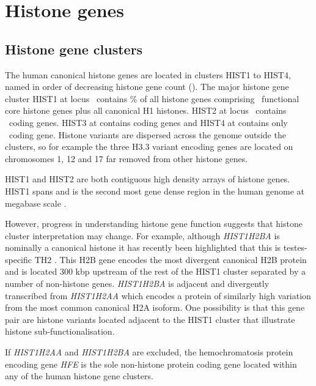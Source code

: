 \section{Histone genes}

  \subsection{Histone gene clusters}
    The human canonical histone genes are located in clusters HIST1 to HIST4, 
	named in order of decreasing histone gene count ().
	The major histone gene cluster HIST1 at locus~\HISTOneLocus{}  
	contains \% of all histone genes 
	comprising \CodingGenesInHISTOne{}~functional core histone genes plus all canonical H1 histones. 
	HIST2 at locus~\HISTTwoLocus{} contains \CodingGenesInHISTTwo{}~coding genes. 
	HIST3 at \HISTThreeLocus{} contains \CodingGenesInHISTThree{} coding genes 
	and HIST4 at \HISTFourLocus{} contains only \CodingGenesInHISTFour{}~coding gene. 
	Histone variants are dispersed across the genome outside the clusters, 
	so for example the three H3.3 variant encoding genes are located on chromosomes 1, 12 and 17 
	far removed from other histone genes.

	HIST1 and HIST2 are both contiguous high density arrays of histone genes. 
	HIST1 spans \HISTOneSpan{} 
	and is the second most gene dense region in the human genome at megabase scale \citep{MHC-III-analysis}.

	However, progress in understanding histone gene function suggests 
	that histone cluster interpretation may change. 
	For example, although \textit{HIST1H2BA} is nominally a canonical histone 
	it has recently been highlighted that this is testes-specific TH2 \citep{Urahama2014}.
	This H2B gene encodes the most divergent canonical H2B protein 
	and is located 300 kbp upstream of the rest of the HIST1 cluster 
	separated by a number of non-histone genes. 
	\textit{HIST1H2BA} is adjacent and divergently transcribed from \textit{HIST1H2AA} 
	which encodes a protein of similarly high variation from the most common canonical H2A isoform. 
	One possibility is that this gene pair are histone variants 
	located adjacent to the HIST1 cluster that illustrate histone sub-functionalisation.

	If \textit{HIST1H2AA} and \textit{HIST1H2BA} are excluded, 
	the hemochromatosis protein encoding gene \textit{HFE} \citep{AlbigDoenecke1998} 
	is the sole non-histone protein coding gene located within any of the human histone gene clusters. 

